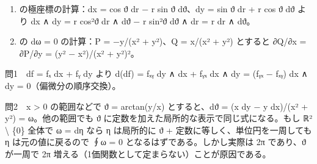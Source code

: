 \documentclass[
  10pt,
  a4paper,
]{article}
\begin{document}
\begin{enumerate}
\def\labelenumi{(\arabic{enumi})}
\item
  の極座標の計算：dx = cos {\fallbackfont ϑ} dr − r sin
  {\fallbackfont ϑ} d{\fallbackfont ϑ}、dy = sin {\fallbackfont ϑ} dr +
  r cos {\fallbackfont ϑ} d{\fallbackfont ϑ} より dx ∧ dy = r
  cos²{\fallbackfont ϑ} dr ∧ d{\fallbackfont ϑ} − r
  sin²{\fallbackfont ϑ} d{\fallbackfont ϑ} ∧ dr = r dr ∧
  d{\fallbackfont ϑ}。
\item
  の dω = 0 の計算：P = −y/(x² + y²)、Q = x/(x² + y²) とすると ∂Q/∂x =
  ∂P/∂y = (y² − x²)/(x² + y²)²。
\end{enumerate}

問1　df = f{\fallbackfont ₓ} dx + f{\fallbackfont ᵧ} dy より d(df) =
f{\fallbackfont ₓᵧ} dy ∧ dx + f{\fallbackfont ᵧₓ} dx ∧ dy =
(f{\fallbackfont ᵧₓ} − f{\fallbackfont ₓᵧ}) dx ∧ dy =
0（偏微分の順序交換）。

問2　x \textgreater{} 0 の範囲などで {\fallbackfont ϑ} = arctan(y/x)
とすると、d{\fallbackfont ϑ} = (x dy − y dx)/(x² + y²) = ω。他の範囲でも
{\fallbackfont ϑ} に定数を加えた局所的な表示で同じ式になる。もし
{\fallbackfont ℝ}² \textbackslash{} \{0\} 全体で ω = dη なら η
は局所的に {\fallbackfont ϑ} + 定数に等しく、単位円を一周しても η
は元の値に戻るので ∮ω = 0 となるはずである。しかし実際は 2π
であり、{\fallbackfont ϑ} が一周で 2π
増える（1価関数として定まらない）ことが原因である。
\end{document}
